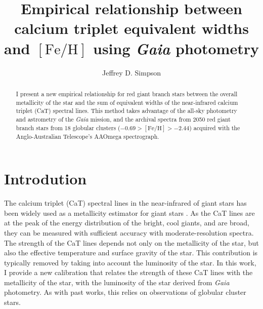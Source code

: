\documentclass[RNAAS]{aastex63}
\newcommand{\feh}{\ensuremath{[\textrm{Fe}/\textrm{H}]}\xspace}
\newcommand{\gaia}{\textit{Gaia}\xspace}
\begin{document}
\title{Empirical relationship between calcium triplet equivalent widths and \feh  using \gaia photometry}


\author[0000-0002-8165-2507]{Jeffrey D. Simpson}

\begin{abstract}
I present a new empirical relationship for red giant branch stars between the overall metallicity of the star and the sum of equivalent widths of the near-infrared calcium triplet (CaT) spectral lines. This method takes advantage of the all-sky photometry and astrometry of the \gaia mission, and the archival spectra from 2050 red giant branch stars from 18 globular clusters ($-0.69>\feh>-2.44$) acquired with the Anglo-Australian Telescope's AAOmega spectrograph.
\end{abstract}


\section{Introdution}

The calcium triplet (CaT) spectral lines in the near-infrared of giant stars has been widely used as a metallicity estimator for giant stars \citep[e.g.,][]{Armandroff1991,Carrera2013,Mauro2014,Starkenburg2010,Vasquez2018, Usher2019}.
As the CaT lines are at the peak of the energy distribution of the bright, cool giants, and are broad, they can be measured with sufficient accuracy with moderate-resolution spectra.
The strength of the CaT lines depends not only on the metallicity of the star, but also the effective temperature and surface gravity of the star. This contribution is typically removed by taking into account the luminosity of the star.
In this work, I provide a new calibration that relates the strength of these CaT lines with the metallicity of the star, with the luminosity of the star derived from \gaia photometry. As with past works, this relies on observations of globular cluster stars.
\end{document}
